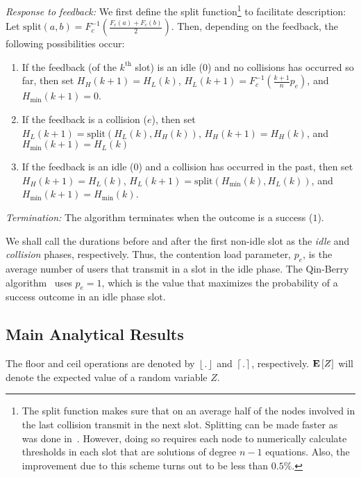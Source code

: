 \documentclass[12pt,draftcls,peerreview, onecolumn]{IEEEtran}
\newcommand{\brac}[1]{\left({#1}\right)}
\newcommand{\floor}[1]{\left\lfloor{#1}\right\rfloor}
\newcommand{\ceil}[1]{\left\lceil {#1} \right\rceil}
\newcommand{\kth}{^{{\mathrm{th}}}}
\newcommand{\expect}[1]{{\bf E}\left[{#1}\right]}
\newcommand{\hsplit}[1]{\text{split}\brac{#1}}
\begin{document}
{\em Response to feedback:} We first define the split
function\footnote{The split function makes sure that on an average
  half of the nodes involved in the last collision transmit in the
  next slot.  Splitting can be made faster as was done
  in~\cite{cohen_1995_Cybernetics}. However, doing so requires each
  node to numerically calculate thresholds in each slot that are
  solutions of degree $n-1$ equations. Also, the improvement due to
  this scheme turns out to be less than $0.5\%$.}  to facilitate
description: Let $\hsplit{a,b} =
F_c^{-1}\brac{\frac{F_c(a)+F_c(b)}{2}}.$ Then, depending on the
feedback, the following possibilities occur:
\begin{enumerate}
\item If the feedback (of the $k\kth$ slot) is an idle ($0$) and no collisions has occurred so far, then set $H_H(k+1) = H_L(k)$,
  $H_L(k+1) = F_{c}^{-1}(\frac{k+1}{n}p_e)$, and  \mbox{$H_{\min}(k+1) =  0$}.


\item If the feedback is a collision ($e$), then set \mbox{$H_L(k+1) =
    \hsplit{H_L(k),H_H(k)}$}, $H_H(k+1) = H_H(k)$, and
  $H_{\min}(k+1) = H_L(k)$

\item If the feedback is an idle ($0$) and a collision has occurred in
  the past, then set $H_H(k+1) = H_L(k)$, $H_L(k+1) =
  \hsplit{H_{\min}(k), H_L(k)}$, and $H_{\min}(k+1) = H_{\min}(k)$.
\end{enumerate}
{\em Termination:} The algorithm terminates when the outcome is a
success ($1$).


We shall call the durations before and after the first non-idle slot
as the {\it idle} and {\it collision} phases, respectively.  Thus, the
contention load parameter, $p_e$, is the average number of users that
transmit in a slot in the idle phase. The Qin-Berry
algorithm~\cite{qin_infocomm_2004} uses $p_e = 1$, which is the value
that maximizes the probability of a success outcome in an idle phase
slot.

\subsection{Main Analytical Results}

The floor and ceil operations are denoted by $\floor{.}$ and
$\ceil{.}$, respectively. $\expect{Z}$ will denote the expected value
of a random variable $Z$.
\end{document}
